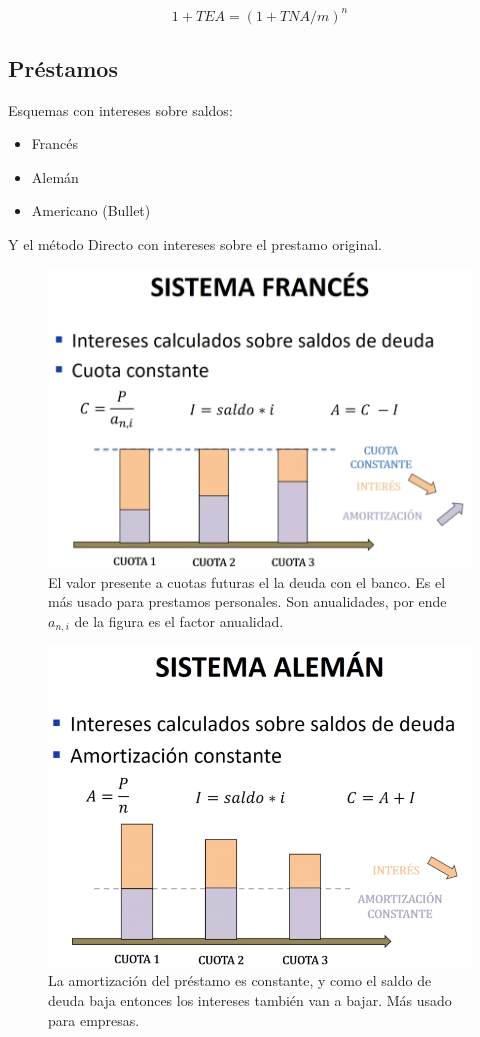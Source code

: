\documentclass[twocolumn,10pt]{article}
\begin{document}
\[
	1 + TEA = (1 + TNA/m)^{n}
\]


\subsection{Préstamos}

Esquemas con intereses sobre saldos:
\begin{itemize}
	\item Francés
	\item Alemán
	\item Americano (Bullet)
\end{itemize}

Y el método Directo con intereses sobre el prestamo original.
\begin{figure}
	\centering
	\includegraphics[width=0.7\linewidth]{fig/sist_frances.png}
	\caption{El valor presente a cuotas futuras el la deuda con el banco. Es el más usado para prestamos personales. Son anualidades, por ende $a_{n,i}$ de la figura es el factor anualidad.}
	\label{fig:sist_frances}
\end{figure}

\begin{figure}
	\centering
	\includegraphics[width=0.7\linewidth]{fig/sist_aleman.png}
	\caption{La amortización del préstamo es constante, y como el saldo de deuda baja entonces los intereses también van a bajar. Más usado para empresas. }
	\label{fig:sist_aleman}
\end{figure}
\end{document}
